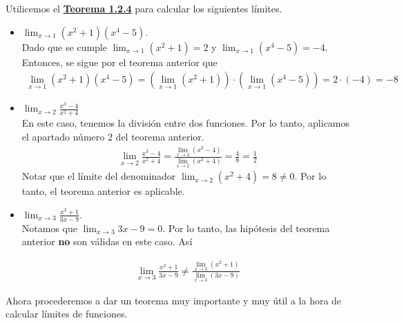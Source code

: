 \documentclass[12pt]{book}
\begin{document}
\begin{eje}{}{}
    Utilicemos el \hyperref[th:teo1.2.4]{\textbf{Teorema 1.2.4}} para calcular los siguientes límites.
    \begin{itemize}
        \item $\displaystyle \lim_{x\to 1}(x^2+1)(x^4-5)$. \\
        
Dado que se cumple $\displaystyle \lim_{x\to 1}(x^2+1)=2$ y $\displaystyle \lim_{x\to 1} (x^4-5)=-4$. Entonces, se sigue por el teorema anterior que
\begin{align*}
    \lim_{x\to 1}(x^2+1)(x^4-5)=\left(\lim_{x\to 1 } (x^2+1)\right)\cdot \left(\lim_{x\to 1} (x^4-5) \right)=2\cdot (-4)=-8
\end{align*}

\item $\displaystyle \lim_{x\to 2}\frac{x^3-4}{x^2+4}$ \\

En este caso, tenemos la división entre dos funciones. Por lo tanto, aplicamos el apartado número 2 del teorema anterior.
\begin{align*}
    \lim_{x\to 2}\frac{x^3-4}{x^2+4}=\frac{\displaystyle\lim_{x\to 2}(x^3-4)}{\displaystyle \lim_{x\to 2}(x^2+4)}=\frac{4}{8}=\frac{1}{2}
\end{align*}
Notar que el límite del denominador $\displaystyle \lim_{x\to 2}(x^2+4)=8\neq 0$. Por lo tanto, el teorema anterior es aplicable.

\item $\displaystyle \lim_{x \to 3}\frac{x^2+1}{3x-9}$. \\

Notamos que $\displaystyle \lim_{x\to 3}3x-9=0$. Por lo tanto, las hipótesis del teorema anterior \textbf{no} son válidas en este caso. Así

\begin{align*}
    \lim_{x \to 3}\frac{x^2+1}{3x-9}\neq\frac{\displaystyle \lim_{x \to 3}(x^2+1)}{\displaystyle \lim_{x\to 3}(3x-9)}
\end{align*}

    \end{itemize}
\end{eje}

Ahora procederemos a dar un teorema muy importante y muy útil a la hora de calcular límites de funciones.
\end{document}
